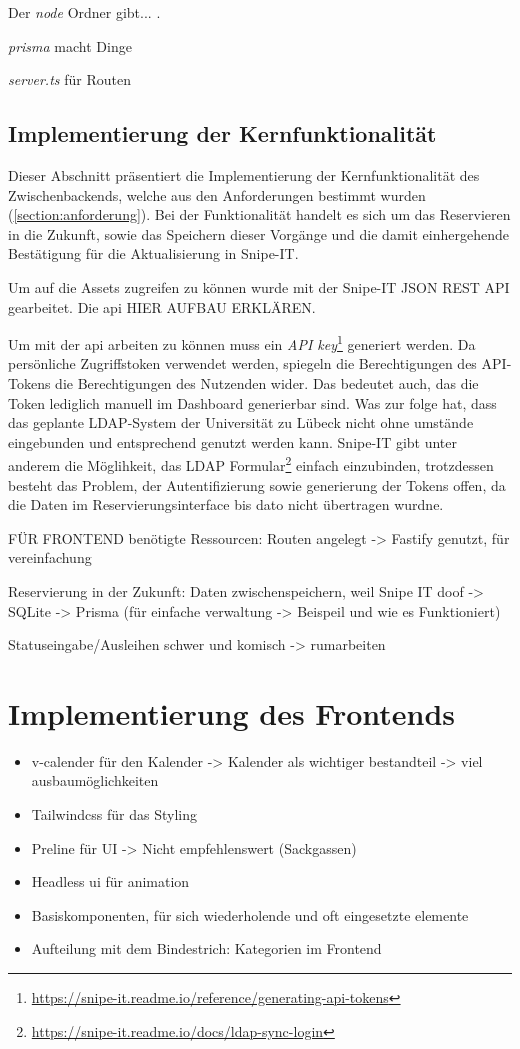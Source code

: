 Der \textit{node} Ordner gibt... .

\textit{prisma} macht Dinge

\textit{server.ts} für Routen

\subsection{Implementierung der Kernfunktionalität}
Dieser Abschnitt präsentiert die Implementierung der Kernfunktionalität des
Zwischenbackends, welche aus den Anforderungen  bestimmt wurden
(\ref{section:anforderung}). Bei der Funktionalität handelt es sich um das
Reservieren in die Zukunft, sowie das Speichern dieser Vorgänge und die damit
einhergehende Bestätigung für die Aktualisierung in Snipe-IT.

Um auf die Assets zugreifen zu können wurde mit der Snipe-IT JSON REST API
gearbeitet. Die api HIER AUFBAU ERKLÄREN.

Um mit der api arbeiten zu können muss ein \textit{API
  key}\footnote{\url{https://snipe-it.readme.io/reference/generating-api-tokens}}
  generiert werden. Da persönliche Zugriffstoken verwendet werden, spiegeln die
  Berechtigungen des API-Tokens die Berechtigungen des Nutzenden wider. Das
  bedeutet auch, das die Token lediglich manuell im Dashboard generierbar sind.
  Was zur folge hat, dass das geplante LDAP-System der Universität zu Lübeck
  nicht ohne umstände eingebunden und entsprechend genutzt werden kann. Snipe-IT
  gibt unter anderem die Möglihkeit, das LDAP
  Formular\footnote{\url{https://snipe-it.readme.io/docs/ldap-sync-login}}
  einfach einzubinden, trotzdessen besteht das Problem, der Autentifizierung
  sowie generierung der Tokens offen, da die Daten im Reservierungsinterface bis
  dato nicht übertragen wurdne.


FÜR FRONTEND benötigte Ressourcen: Routen angelegt -> Fastify genutzt, für
vereinfachung


Reservierung in der Zukunft: Daten zwischenspeichern, weil Snipe IT doof ->
SQLite -> Prisma (für einfache verwaltung -> Beispeil und wie es Funktioniert)


Statuseingabe/Ausleihen schwer und komisch -> rumarbeiten

\section{Implementierung des Frontends}
\begin{itemize}
  \item v-calender für den Kalender -> Kalender als wichtiger bestandteil ->
        viel ausbaumöglichkeiten
  \item Tailwindcss für das Styling
  \item Preline für UI -> Nicht empfehlenswert (Sackgassen)
  \item Headless ui für animation
  \item Basiskomponenten, für sich wiederholende und oft eingesetzte elemente
  \item Aufteilung mit dem Bindestrich: Kategorien im Frontend
\end{itemize}



